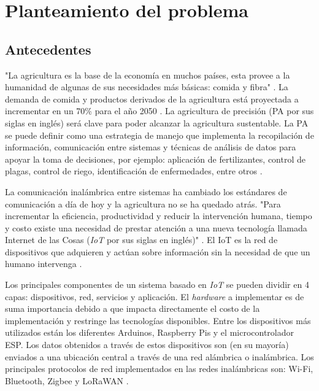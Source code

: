 \section{Planteamiento del problema}

\subsection{Antecedentes}

"La agricultura es la base de la economía en muchos países, esta provee a la humanidad de algunas de sus necesidades más básicas: comida y fibra" \cite{appsremotesensing}. 
La demanda de comida y productos derivados de la agricultura está proyectada a incrementar en un 70\% para el año 2050 \cite{wik_pingali_brocai_2008}. 
La agricultura de precisión (PA por sus siglas en inglés) será clave para poder alcanzar la agricultura sustentable. La PA se puede definir como una 
estrategia de manejo que implementa la recopilación de información, comunicación entre sistemas y técnicas de análisis de datos para apoyar la toma 
de decisiones, por ejemplo: aplicación de fertilizantes, control de plagas, control de riego, identificación de enfermedades, entre otros \cite{appsremotesensing}.

La comunicación inalámbrica entre sistemas ha cambiado los estándares de comunicación a día de hoy y la agricultura no se ha quedado atrás. 
"Para incrementar la eficiencia, productividad y reducir la intervención humana, tiempo y costo existe una necesidad de prestar atención a una
nueva tecnología llamada Internet de las Cosas (\textit{IoT} por sus siglas en inglés)" \cite{agriculture_automation_review}. El IoT es la red de dispositivos 
que adquieren y actúan sobre información sin la necesidad de que un humano intervenga \cite{agriculture_automation_review}. 

Los principales componentes de un sistema basado en \textit{IoT} se pueden dividir en 4 capas: dispositivos, red, servicios y aplicación. 
El \textit{hardware} a implementar es de suma importancia debido a que impacta directamente el costo de la implementación y restringe 
las tecnologías disponibles. Entre los dispositivos más utilizados están los diferentes Arduinos, Raspberry Pis y el microcontrolador ESP. 
Los datos obtenidos a través de estos dispositivos son (en su mayoría) enviados a una ubicación central a través de una red alámbrica o inalámbrica.
Los principales protocolos de red implementados en las redes inalámbricas son: Wi-Fi, Bluetooth, Zigbee y LoRaWAN \cite{systematicreviewiot}. 

